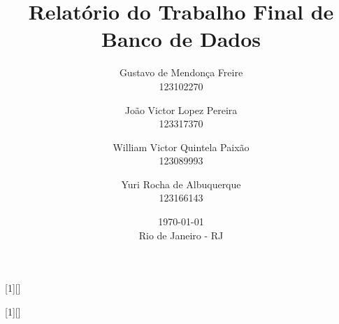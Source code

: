 \usepackage[brazil]{babel}
\usepackage[utf8]{inputenc}
\usepackage[T1]{fontenc}

\usepackage{tocloft}
\usepackage{hyperref}
\usepackage{csquotes}
\usepackage[backend=biber]{biblatex}
\usepackage{graphicx}
\usepackage{float}

\graphicspath{{figures/}}

\usepackage[margin=1in]{geometry}         %
\usepackage{listings}
\usepackage{amsmath, amssymb}             %
\usepackage{indentfirst}                  %
\usepackage{xcolor}                       %
\setlength{\parskip}{\baselineskip}       %
\setlength{\footnotesep}{0.8em}           %
\setlength{\skip\footins}{2em}            %
\setlength{\cftbeforechapskip}{12pt}      %
\setlength{\cftbeforesecskip}{6pt}        %


\title{ Relatório do Trabalho Final de Banco de Dados}
\date{\today\\ \vfill Rio de Janeiro - RJ}   
\author{Gustavo de Mendonça Freire     \\ 123102270 
   \and João Victor Lopez Pereira      \\ 123317370 
   \and William Victor Quintela Paixão \\ 123089993 
   \and Yuri Rocha de Albuquerque      \\ 123166143
}


[1][]{
  \lstset{
    basicstyle=\ttfamily,
    columns=flexible,
    breaklines=true, 
    breakatwhitespace=true, 
    frame=none,
    basewidth=0.5em,
    aboveskip=13pt,
    belowskip=0pt, 
    #1
  }
}{}

[1][]{
  \lstset{
    basicstyle=\ttfamily\itshape, 
    breaklines=true, 
    breakatwhitespace=true, 
    frame=none, 
    aboveskip=0pt, 
    #1
  }
}{}

